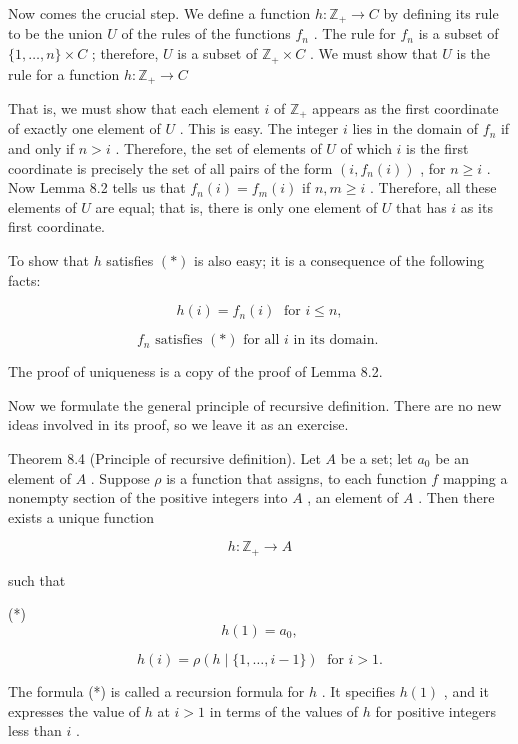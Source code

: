 \documentclass[10pt]{article}
\begin{document}
Now comes the crucial step. We define a function \(h : {\mathbb{Z}}_{ + } \rightarrow  C\) by defining its rule to be the union \(U\) of the rules of the functions \({f}_{n}\) . The rule for \({f}_{n}\) is a subset of \(\{ 1,\ldots ,n\}  \times  C\) ; therefore, \(U\) is a subset of \({\mathbb{Z}}_{ + } \times  C\) . We must show that \(U\) is the rule for a function \(h : {\mathbb{Z}}_{ + } \rightarrow  C\)

That is, we must show that each element \(i\) of \({\mathbb{Z}}_{ + }\) appears as the first coordinate of exactly one element of \(U\) . This is easy. The integer \(i\) lies in the domain of \({f}_{n}\) if and only if \(n > i\) . Therefore, the set of elements of \(U\) of which \(i\) is the first coordinate is precisely the set of all pairs of the form \(\left( {i,{f}_{n}\left( i\right) }\right)\) , for \(n \geq  i\) . Now Lemma 8.2 tells us that \({f}_{n}\left( i\right)  = {f}_{m}\left( i\right)\) if \(n,m \geq  i\) . Therefore, all these elements of \(U\) are equal; that is, there is only one element of \(U\) that has \(i\) as its first coordinate.

To show that \(h\) satisfies \(\left( *\right)\) is also easy; it is a consequence of the following facts:

\[
h\left( i\right)  = {f}_{n}\left( i\right) \;\text{ for }i \leq  n,
\]

\[
{f}_{n}\text{ satisfies }\left( *\right) \text{ for all }i\text{ in its domain. }
\]

The proof of uniqueness is a copy of the proof of Lemma 8.2.

Now we formulate the general principle of recursive definition. There are no new ideas involved in its proof, so we leave it as an exercise.

Theorem 8.4 (Principle of recursive definition). Let \(A\) be a set; let \({a}_{0}\) be an element of \(A\) . Suppose \(\rho\) is a function that assigns, to each function \(f\) mapping a nonempty section of the positive integers into \(A\) , an element of \(A\) . Then there exists a unique function

\[
h : {\mathbb{Z}}_{ + } \rightarrow  A
\]

such that

(*)
\[
h\left( 1\right)  = {a}_{0},
\]

\[
h\left( i\right)  = \rho \left( {h\mid \{ 1,\ldots ,i - 1\} }\right) \;\text{ for }i > 1.
\]

The formula (*) is called a recursion formula for \(h\) . It specifies \(h\left( 1\right)\) , and it expresses the value of \(h\) at \(i > 1\) in terms of the values of \(h\) for positive integers less than \(i\) .
\end{document}
